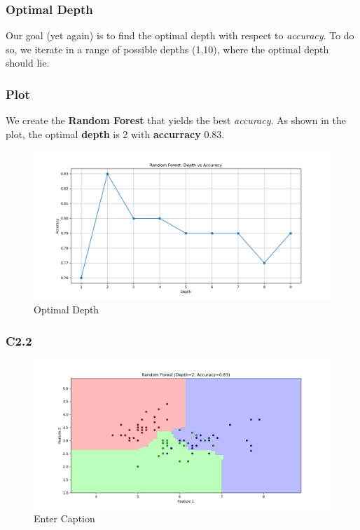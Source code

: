 \documentclass{beamer}
\begin{document}
\begin{frame}
\frametitle{Optimal Depth}
Our goal (yet again) is to find the optimal depth with respect to \textit{accuracy}. To do so, we iterate in a range of possible depths (1,10), where the optimal depth should lie.
\end{frame}

\begin{frame}
\frametitle{Plot}
We create the \textbf{Random Forest} that yields the best \textit{accuracy}. As shown in the plot, the optimal \textbf{depth} is 2 with \textbf{accurracy} 0.83.
\begin{figure}
    \centering
    \includegraphics[width=1\linewidth]{assets/C2.1.png}
    \caption{Optimal Depth}
    \label{fig:enter-label}
\end{figure}
\end{frame}

\begin{frame}
\frametitle{C2.2}
\begin{figure}
    \centering
    \includegraphics[width=1\linewidth]{assets/C2.2.png}
    \caption{Enter Caption}
    \label{fig:enter-label}
\end{figure}
\end{frame}
\end{document}
